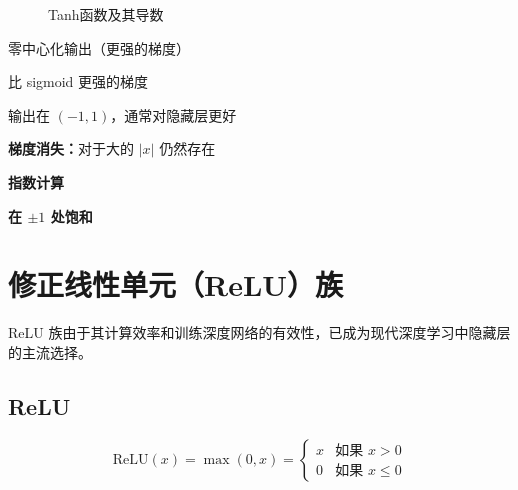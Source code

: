 \begin{figure}[htbp]
    \centering
    \caption[Tanh函数及其导数]{Tanh函数及其导数}
    \label{fig:tanh}
\end{figure}

\begin{advantages}
    \item 零中心化输出（更强的梯度）
    \item 比 sigmoid 更强的梯度
    \item 输出在 $(-1, 1)$，通常对隐藏层更好
\end{advantages}

\begin{disadvantages}
    \item \textbf{梯度消失：}对于大的 $|x|$ 仍然存在
    \item \textbf{指数计算}
    \item \textbf{在 $\pm 1$ 处饱和}
\end{disadvantages}

\section{修正线性单元（ReLU）族}

ReLU 族由于其计算效率和训练深度网络的有效性，已成为现代深度学习中隐藏层的主流选择。

\subsection{ReLU}

\begin{equation}
\text{ReLU}(x) = \max(0, x) = 
\begin{cases}
x & \text{如果 } x > 0 \\
0 & \text{如果 } x \leq 0
\end{cases}
\end{equation}

